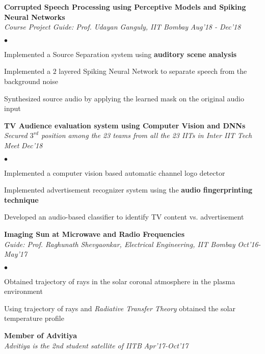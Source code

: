 \documentclass[margin,line, 9pt]{res}
\newenvironment{list2}{
  \begin{list}{$\bullet$}{%
      \setlength{\itemsep}{0.03in}
      \setlength{\parsep}{0in} \setlength{\parskip}{0in}
      \setlength{\topsep}{0in} \setlength{\partopsep}{0in} 
      \setlength{\leftmargin}{0.2in}}}{\end{list}}
\begin{document}
%
% 
% 
% 
{\bf Corrupted Speech Processing using Perceptive Models and Spiking Neural Networks} \\
{\em Course Project Guide: Prof. Udayan Ganguly, IIT Bombay} \hfill {\it Aug'18 - Dec'18}\\
\vspace*{-.13in}
\begin{list2}
\item Implemented a Source Separation system using \textbf{auditory scene analysis}
\item Implemented a $2$ layered Spiking Neural Network to separate speech from the background noise
\item Synthesized source audio by applying the learned mask on the original audio input
\end{list2}
% 
% 
% 
%
{\bf TV Audience evaluation system using Computer Vision and DNNs} \\
{\em Secured $3^{rd}$ position among the 23 teams from all the 23 IITs in Inter IIT Tech Meet} \hfill {\it Dec'18}\\
\vspace*{-.13in}
\begin{list2}
\item Implemented a computer vision based automatic channel logo detector
\item Implemented advertisement recognizer system using the \textbf{audio fingerprinting technique}
\item Developed an audio-based classifier to identify TV content vs. advertisement
\end{list2}
% 
% 
{\bf Imaging Sun at Microwave and Radio Frequencies} \\
{\em Guide: Prof. Raghunath Shevgaonkar, Electrical Engineering, IIT Bombay} \hfill {\it Oct'16-May'17}\\
\vspace*{-.13in}
\begin{list2}
\item Obtained trajectory of rays in the solar coronal atmosphere in the plasma environment
\item Using trajectory of rays and \emph{Radiative Transfer Theory} obtained the solar temperature profile
\end{list2}
% 
% 
{\bf Member of Advitiya} \\
{\em Advitiya is the 2nd student satellite of IITB} \hfill {\it Apr'17-Oct'17}\\
\end{document}
